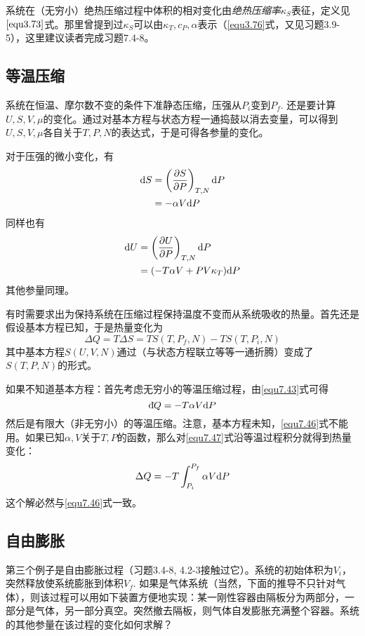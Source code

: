 系统在（无穷小）绝热压缩过程中体积的相对变化由{\it 绝热压缩率}$\kappa_S$表征，定义见$\eqref{equ3.73}$式。那里曾提到过$\kappa_S$可以由$\kappa_T, c_P, \alpha$表示（\eqref{equ3.76}式，又见习题3.9-5），这里建议读者完成习题7.4-8。

\subsection*{等温压缩}
系统在恒温、摩尔数不变的条件下准静态压缩，压强从$P_i$变到$P_f$. 还是要计算$U, S, V, \mu$的变化。通过对基本方程与状态方程一通捣鼓以消去变量，可以得到$U, S, V, \mu$各自关于$T, P, N$的表达式，于是可得各参量的变化。

对于压强的微小变化，有
\begin{align}
	\mathrm{d} S &= \left( \frac{\partial S}{\partial P} \right)_{T, N} \mathrm{d} P \label{equ7.42} \\
	&= -\alpha V \mathrm{d} P \label{equ7.43}
\end{align}
同样也有
\begin{align}
	\mathrm{d} U &= \left( \frac{\partial U}{\partial P} \right)_{T, N} \mathrm{d} P \label{equ7.44} \\
	&= ( -T \alpha V + PV \kappa_T) \mathrm{d} P \label{equ7.45}
\end{align}
其他参量同理。

有时需要求出为保持系统在压缩过程保持温度不变而从系统吸收的热量。首先还是假设基本方程已知，于是热量变化为
\begin{equation}
	\Delta Q = T\Delta S = TS(T, P_f, N) - TS(T, P_i, N)
\label{equ7.46}
\end{equation}
其中基本方程$S(U, V, N)$通过（与状态方程联立等等一通折腾）变成了$S(T, P, N)$的形式。 

如果不知道基本方程：首先考虑无穷小的等温压缩过程，由\eqref{equ7.43}式可得
\begin{equation}
	\mathrm d\hspace*{-0.1em}\bar{}\hspace*{0.08em} Q = -T\alpha V \mathrm{d} P 
\label{equ7.47}
\end{equation}
然后是有限大（非无穷小）的等温压缩。注意，基本方程未知，\eqref{equ7.46}式不能用。如果已知$\alpha, V$关于$T, P$的函数，那么对\eqref{equ7.47}式沿等温过程积分就得到热量变化：
\begin{equation}
	\Delta Q = -T \int_{P_i}^{P_f} \alpha V \mathrm{d} P 
\label{equ7.48}
\end{equation}
这个解必然与\eqref{equ7.46}式一致。

\subsection*{自由膨胀}
第三个例子是自由膨胀过程（习题3.4-8, 4.2-3接触过它）。系统的初始体积为$V_i$，突然释放使系统膨胀到体积$V_f$. 如果是气体系统（当然，下面的推导不只针对气体），则该过程可以用如下装置方便地实现：某一刚性容器由隔板分为两部分，一部分是气体，另一部分真空。突然撤去隔板，则气体自发膨胀充满整个容器。系统的其他参量在该过程的变化如何求解？

